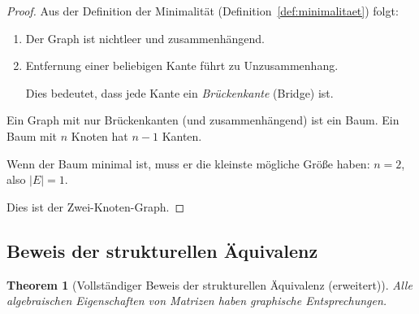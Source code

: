\documentclass[12pt, a4paper]{article}
\newtheorem{theorem}{Theorem}[section]
\theoremstyle{definition}
\theoremstyle{remark}
\begin{document}
\begin{proof}
Aus der Definition der Minimalität (Definition~\ref{def:minimalitaet}) folgt:

\begin{enumerate}[label=(\roman*)]
  \item Der Graph ist nichtleer und zusammenhängend.
  
  \item Entfernung einer beliebigen Kante führt zu Unzusammenhang.
  
  Dies bedeutet, dass jede Kante ein \emph{Brückenkante} (Bridge) ist.
\end{enumerate}

Ein Graph mit nur Brückenkanten (und zusammenhängend) ist ein Baum. Ein Baum mit $n$ Knoten hat $n-1$ Kanten.

Wenn der Baum minimal ist, muss er die kleinste mögliche Größe haben: $n = 2$, also $|E| = 1$.

Dies ist der Zwei-Knoten-Graph.
\end{proof}

\subsection{Beweis der strukturellen Äquivalenz}
\label{subsec:anhang_struktur}

\begin{theorem}[Vollständiger Beweis der strukturellen Äquivalenz (erweitert)]
\label{thm:anhang_struktur_aequivalenz}
Alle algebraischen Eigenschaften von Matrizen haben graphische Entsprechungen.
\end{theorem}
\end{document}
